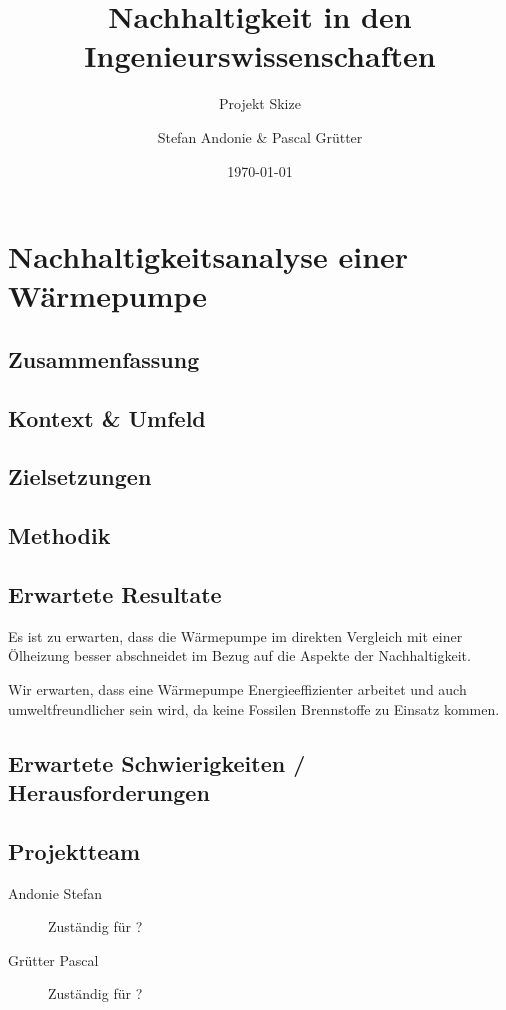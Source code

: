 \documentclass[10pt,paper=a4,final]{scrartcl}
\title{Nachhaltigkeit in den Ingenieurswissenschaften}
\subtitle{Projekt Skize}
\author{Stefan Andonie \& Pascal Grütter}
\date{\today{}}
\begin{document}
\section*{Nachhaltigkeitsanalyse einer Wärmepumpe}

\subsection*{Zusammenfassung}

\subsection*{Kontext \& Umfeld}

\subsection*{Zielsetzungen}

\subsection*{Methodik}

\subsection*{Erwartete Resultate}

  Es ist zu erwarten, dass die Wärmepumpe im direkten Vergleich mit einer
  Ölheizung besser abschneidet im Bezug auf die Aspekte der Nachhaltigkeit.
  
  Wir erwarten, dass eine Wärmepumpe Energieeffizienter arbeitet und auch
  umweltfreundlicher sein wird, da keine Fossilen Brennstoffe zu Einsatz kommen.

\subsection*{Erwartete Schwierigkeiten / Herausforderungen}

\subsection*{Projektteam}

  \begin{description}
    \item[Andonie Stefan] Zuständig für ?
    \item[Grütter Pascal] Zuständig für ?
  \end{description}
\end{document}
